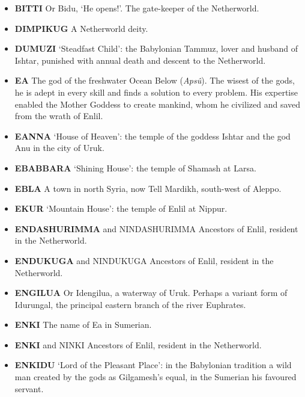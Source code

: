 \documentclass{article}
\begin{document}
\begin{multicols}{3}
\begin{small}
\begin{itemize}[
        label=,
        leftmargin=1.0em,
        itemindent=-1.0em,
        nosep,
    ]
    \item \textbf{BITTI}
    Or Bidu, `He opens!'. The gate-keeper of the Netherworld.

    \item \textbf{DIMPIKUG}
    A Netherworld deity.

    \item \textbf{DUMUZI}
    `Steadfast Child': the Babylonian Tammuz, lover and husband of Ishtar,
    punished with annual death and descent to the Netherworld.

    \item \textbf{EA}
    The god of the
    freshwater Ocean Below (\emph{Apsû}). The wisest of the gods, he is
    adept in every skill and finds a solution to every problem. His
    expertise enabled the Mother Goddess to create mankind, whom he
    civilized and saved from the wrath of Enlil.

    \item \textbf{EANNA}
    `House of Heaven': the temple of the goddess Ishtar and the god Anu in
    the city of Uruk.

    \item \textbf{EBABBARA}
    `Shining House': the temple of Shamash at Larsa.

    \item \textbf{EBLA}
    A town in north Syria, now Tell Mardikh, south-west of Aleppo.

    \item \textbf{EKUR}
    `Mountain House': the temple of Enlil at Nippur.

    \item \textbf{ENDASHURIMMA}
    and NINDASHURIMMA Ancestors of Enlil, resident in the Netherworld.

    \item \textbf{ENDUKUGA}
    and NINDUKUGA Ancestors of Enlil, resident in the Netherworld.

    \item \textbf{ENGILUA}
    Or Idengilua, a waterway of Uruk. Perhaps a variant form of Idurungal,
    the principal eastern branch of the river Euphrates.

    \item \textbf{ENKI}
    The name of Ea in Sumerian.

    \item \textbf{ENKI}
    and NINKI Ancestors of Enlil, resident in the Netherworld.

    \item \textbf{ENKIDU}
    `Lord of the Pleasant Place': in the Babylonian tradition a wild man
    created by the gods as Gilgamesh's equal, in the Sumerian his favoured
    servant.


\end{itemize}
\end{small}
\end{multicols}
\end{document}
